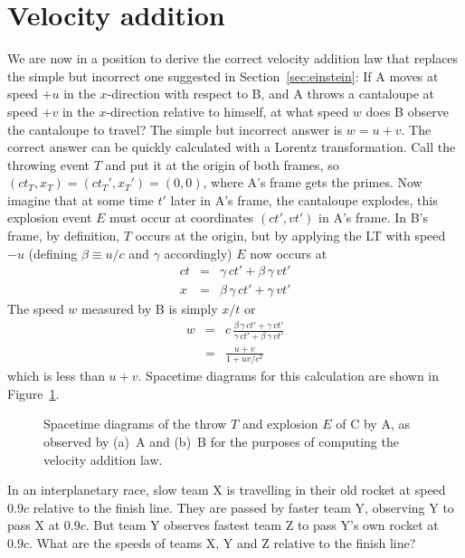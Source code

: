 \section{Velocity addition}
\label{sec:vadd}

We are now in a position to derive the correct velocity addition law
that replaces the simple but incorrect one suggested in
Section~\ref{sec:einstein}: If A moves at speed $+u$ in the
$x$-direction with respect to B, and A throws a cantaloupe at speed
$+v$ in the $x$-direction relative to himself, at what speed $w$ does
B observe the cantaloupe to travel?  The simple but incorrect answer
is $w=u+v$.  The correct answer can be quickly calculated with a
Lorentz transformation.  Call the throwing event $T$ and put it at the
origin of both frames, so $(ct_T,x_T)=(ct_T',x_T')=(0,0)$, where A's
frame gets the primes.  Now imagine that at some time $t'$ later in
A's frame, the cantaloupe explodes, this explosion event $E$ must
occur at coordinates $(ct',vt')$ in A's frame.  In B's frame, by
definition, $T$ occurs at the origin, but by applying the LT with
speed $-u$ (defining $\beta\equiv u/c$ and $\gamma$ accordingly) $E$
now occurs at
\begin{eqnarray}
ct & = & \gamma\, ct' + \beta\,\gamma\, vt' \nonumber\\
x & = & \beta\,\gamma\, ct' + \gamma\, vt'
\end{eqnarray}
The speed $w$ measured by B is simply $x/t$ or
\begin{eqnarray}
w & = & c\,\frac{\beta\,\gamma\, ct' + \gamma\, vt'}
                {\gamma\, ct' + \beta\,\gamma\, vt'} \nonumber\\
  & = & \frac{u + v}{1 + uv/c^2}
\end{eqnarray}
which is less than $u+v$.  Spacetime diagrams for this calculation are
shown in Figure~\ref{fig:vadd}.
\begin{figure}
\caption[Velocity addition illustrated.]{Spacetime diagrams of the
throw $T$ and explosion $E$ of C by A, as observed by (a)~A and (b)~B
for the purposes of computing the velocity addition law.}
\label{fig:vadd}
\end{figure}

\begin{problem}
In an interplanetary race, slow team X is travelling in their old
rocket at speed $0.9c$ relative to the finish line.  They are passed
by faster team Y, observing Y to pass X at $0.9c$.  But team Y
observes fastest team Z to pass Y's own rocket at $0.9c$.  What are
the speeds of teams X, Y and Z relative to the finish line?
\end{problem}

